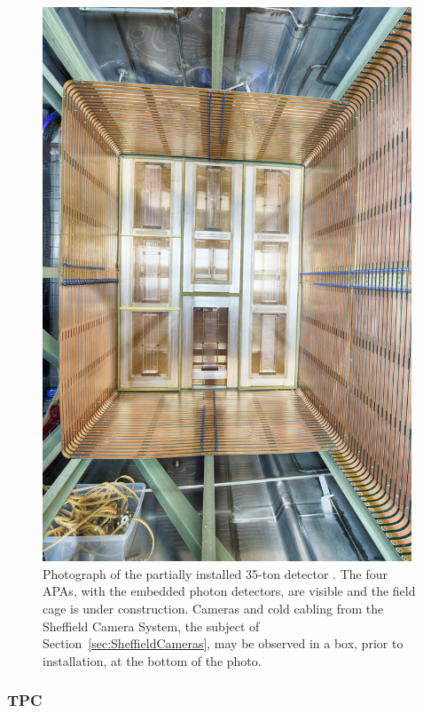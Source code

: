 \begin{figure}
  \centering
  \includegraphics[width=11cm]{35tonPhoto.jpg}
  \caption[Photograph of the partially installed 35-ton detector.]{Photograph of the partially installed 35-ton detector \cite{VMS}.  The four APAs, with the embedded photon detectors, are visible and the field cage is under construction.  Cameras and cold cabling from the Sheffield Camera System, the subject of Section~\ref{sec:SheffieldCameras}, may be observed in a box, prior to installation, at the bottom of the photo.}
  \label{fig:35tonPhoto}
\end{figure}

\subsubsection{TPC}\label{sec:35tonTPC}


